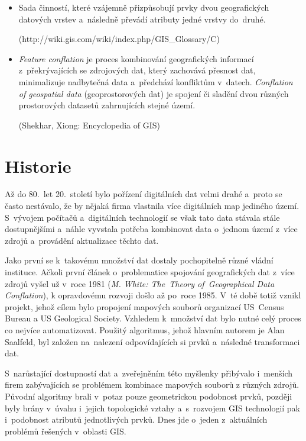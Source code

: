 \begin{itemize}[leftmargin=*]
  \item Sada činností, které vzájemně přizpůsobují prvky dvou geografických datových vrstev a~následně převádí atributy jedné vrstvy do~druhé. %
    
    (http://wiki.gis.com/wiki/index.php/GIS\_Glossary/C)
  
  \item \textit{Feature conflation} je proces kombinování geografických informací z~překrývajících se zdrojových dat, který zachovává přesnost dat, minimalizuje nadbytečná 
    data a~předchází konfliktům v~datech. %
    \textit{Conflation of geospatial data} (geoprostorových dat) je spojení či sladění dvou různých prostorových datasetů zahrnujících stejné území.
    
     (Shekhar, Xiong: Encyclopedia of GIS)

\end{itemize}

\section{Historie} %
\label{historie}

Až do 80.~let 20.~století bylo pořízení digitálních dat velmi drahé a~proto se často nestávalo, že by nějaká firma vlastnila více digitálních map jediného území. S~vývojem
počítačů a~digitálních technologií se však tato data stávala stále dostupnějšími a~náhle vyvstala potřeba kombinovat data o~jednom území z~více zdrojů a~provádění aktualizace
těchto dat. 

Jako první se k~takovému množství dat dostaly pochopitelně různé vládní instituce. Ačkoli první článek o~problematice spojování geografických dat z~více zdrojů vyšel už v~roce
 1981 (\textit{M. White: The~Theory of~Geographical Data Conflation}), k opravdovému rozvoji došlo až po~roce 1985. V~té době totiž vznikl projekt, jehož cílem bylo propojení 
mapových souborů organizací US~Census Bureau a US Geological Society. Vzhledem k~množství dat bylo nutné celý proces co nejvíce automatizovat. Použitý algoritmus, jehož 
hlavním autorem je Alan Saalfeld, byl založen na~nalezení odpovídajících si prvků a~následné transformaci dat. 

S~narůstající dostupností dat a~zveřejněním této myšlenky přibývalo i~menších firem zabývajících
se problémem kombinace mapových souborů z různých zdrojů. Původní algoritmy brali v~potaz pouze geometrickou podobnost prvků, později byly brány v~úvahu
i~jejich topologické vztahy a~s~rozvojem GIS technologií pak i~podobnost atributů jednotlivých prvků. Dnes jde o~jeden z~aktuálních problémů řešených v~oblasti GIS.


